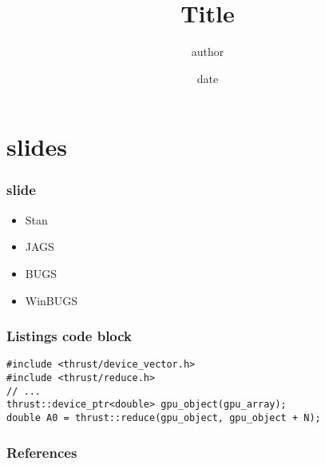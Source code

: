 \documentclass[handout]{beamer}
\title{Title}
\author{author}
\date{date}
\institute{institute}
\numberwithin{equation}{section}
\begin{document}
\begin{frame}
\titlepage
\end{frame}


\section{slides} 

\begin{frame}
\frametitle{slide}
\begin{itemize}
\item Stan 
\item JAGS 
\pause \item BUGS
\item WinBUGS
\end{itemize}
\end{frame}

\begin{frame}[fragile]
\frametitle{Listings code block}
\begin{lstlisting}
#include <thrust/device_vector.h>
#include <thrust/reduce.h>
// ...
thrust::device_ptr<double> gpu_object(gpu_array);
double A0 = thrust::reduce(gpu_object, gpu_object + N);
\end{lstlisting}
\end{frame}

\begin{frame}[allowframebreaks]%
\frametitle{References}
%
%
\end{frame}
\end{document}
